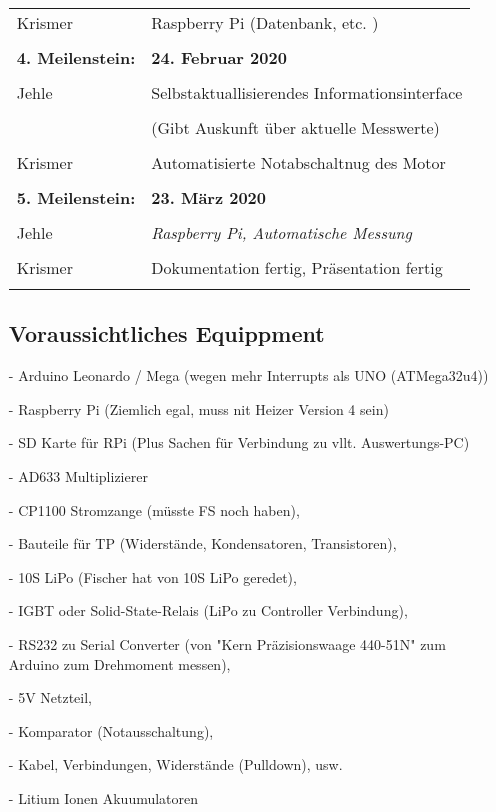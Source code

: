 \documentclass[12pt]{article}
\begin{document}
\begin{itemize}
\begin{tabular}{| l | l |}
Krismer &  Raspberry Pi (Datenbank, etc. ) \\ & \\


\textbf{4. Meilenstein: } & \textbf{24. Februar 2020} \\ \hline & \\
Jehle & Selbstaktuallisierendes Informationsinterface \\ & \\ & (Gibt Auskunft über aktuelle Messwerte)\\ & \\

Krismer &  Automatisierte Notabschaltnug des Motor \\   & \\ \hline 


\textbf{5. Meilenstein: } & \textbf{23. März 2020} \\ \hline & \\
Jehle & \textit{Raspberry Pi, Automatische Messung }\\ & \\
Krismer & Dokumentation fertig, Präsentation fertig\\ & \\ \hline
\end{tabular} 






\newpage
\subsection*{Voraussichtliches Equippment}
 \item[-]Arduino Leonardo / Mega (wegen mehr Interrupts als UNO (ATMega32u4)) 
 \item[-]Raspberry Pi (Ziemlich egal, muss nit Heizer Version 4 sein) 
 \item[-]SD Karte für RPi (Plus Sachen für Verbindung zu vllt. Auswertungs-PC) 
 \item[-]AD633 Multiplizierer 
 \item[-]CP1100 Stromzange (müsste FS noch haben),  
 \item[-]Bauteile für TP (Widerstände, Kondensatoren, Transistoren),  
 \item[-]10S LiPo (Fischer hat von 10S LiPo geredet),  
 \item[-]IGBT oder Solid-State-Relais (LiPo zu Controller Verbindung),  
 \item[-]RS232 zu Serial Converter   (von "Kern Präzisionswaage 440-51N" zum  Arduino zum Drehmoment messen), 
 \item[-] 5V Netzteil, 
 \item[-] Komparator (Notausschaltung), 
 \item[-]Kabel, Verbindungen, Widerstände (Pulldown), usw. 
  \item[-]Litium Ionen Akuumulatoren
  

\end{itemize}
\end{document}
